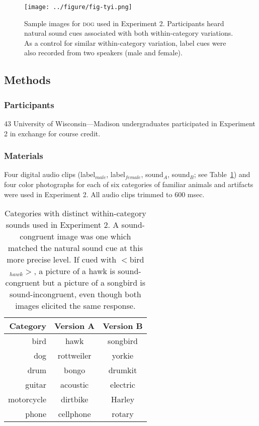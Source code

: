 \documentclass[12pt, titlepage]{article}
\begin{document}
\begin{figure}[h!]
	\centering
	\caption{Sample images for \textsc{dog} used in Experiment 2. Participants heard natural sound cues associated with both within-category variations. As a control for similar within-category variation, label cues were also recorded from two speakers (male and female).}
	\label{fig:dogs}
	\texttt{[image: ../figure/fig-tyi.png]}
\end{figure}

\subsection{Methods}
\subsubsection*{Participants}
43 University of Wisconsin---Madison undergraduates participated in Experiment 2 in exchange for course credit.

\subsubsection*{Materials}
Four digital audio clips (label$_{male}$, label$_{female}$, sound$_{A}$, sound$_{B}$; see Table~\ref{tbl:tyi}) and four color photographs for each of six categories of familiar animals and artifacts were used in Experiment 2. All audio clips trimmed to 600 msec.

\begin{table}[h]
	\centering
    \begin{tabular}{| r || c | c |}
    	\hline
    	\bfseries Category & \bfseries Version A & \bfseries Version B \\ \hline \hline
    	bird & hawk & songbird \\ \hline
    	dog & rottweiler & yorkie \\ \hline
    	drum & bongo & drumkit \\ \hline
    	guitar & acoustic & electric \\ \hline
    	motorcycle & dirtbike & Harley \\ \hline
    	phone & cellphone & rotary \\
    	\hline
    \end{tabular}
    \caption{Categories with distinct within-category sounds used in Experiment 2. A sound-congruent image was one which matched the natural sound cue at this more precise level. If cued with $<$bird$_{hawk}>$, a picture of a hawk is sound-congruent but a picture of a songbird is sound-incongruent, even though both images elicited the same response.}
    \label{tbl:tyi}
\end{table}
\end{document}
